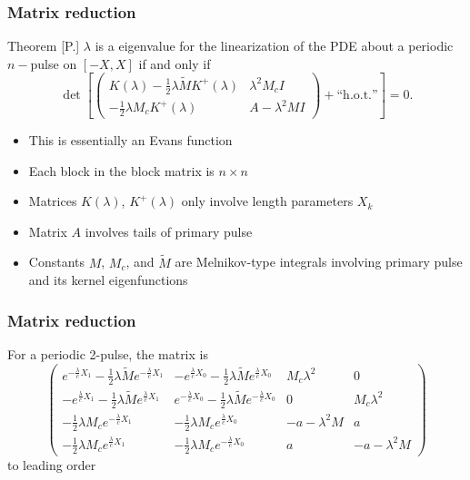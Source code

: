 \documentclass[16pt]{beamer}
\begin{document}
\begin{frame}
\frametitle{Matrix reduction} 
    \begin{block}{Theorem [P.]}
    $\lambda$ is a eigenvalue for the linearization of the PDE about a periodic $n-$pulse on $[-X, X]$ if and only if 
    \[
    \det\left[ \begin{pmatrix}
	K(\lambda) - \frac{1}{2} \lambda \tilde{M} K^+(\lambda) & \lambda^2 M_c I \\
	-\frac{1}{2} \lambda M_c K^+(\lambda) & A - \lambda^2 MI 
	\end{pmatrix} + \text{``h.o.t.''} \right]= 0.
    \]
    \end{block}
    \begin{itemize}
		\item This is essentially an Evans function
    	\item Each block in the block matrix is $n \times n$
    	\item Matrices $K(\lambda)$, $K^+(\lambda)$ only involve length parameters $X_k$
    	\item Matrix $A$ involves tails of primary pulse 
    	\item Constants $M$, $M_c$, and $\tilde{M}$ are Melnikov-type integrals involving primary pulse and its kernel eigenfunctions
    \end{itemize}
\end{frame}

\begin{frame}
\frametitle{Matrix reduction} 
For a periodic 2-pulse, the matrix is 
\[
\begin{pmatrix}
e^{-\frac{\lambda}{c}X_1} -\frac{1}{2}\lambda \tilde{M} e^{-\frac{\lambda}{c}X_1} & -e^{\frac{\lambda}{c}X_0} -\frac{1}{2}\lambda \tilde{M} e^{\frac{\lambda}{c}X_0} & M_c \lambda^2 & 0 \\
-e^{\frac{\lambda}{c}X_1} -\frac{1}{2}\lambda \tilde{M} e^{\frac{\lambda}{c}X_1} & e^{-\frac{\lambda}{c}X_0} -\frac{1}{2}\lambda \tilde{M} e^{-\frac{\lambda}{c}X_0} & 0 & M_c \lambda^2 \\
-\frac{1}{2}\lambda M_c e^{-\frac{\lambda}{c}X_1} & -\frac{1}{2}\lambda M_c e^{\frac{\lambda}{c}X_0} &-a-\lambda^2 M & a \\
-\frac{1}{2}\lambda M_c e^{\frac{\lambda}{c}X_1} & -\frac{1}{2}\lambda M_c e^{-\frac{\lambda}{c}X_0}  & a & -a-\lambda^2 M
\end{pmatrix}
\]
to leading order
\end{frame}
\end{document}
